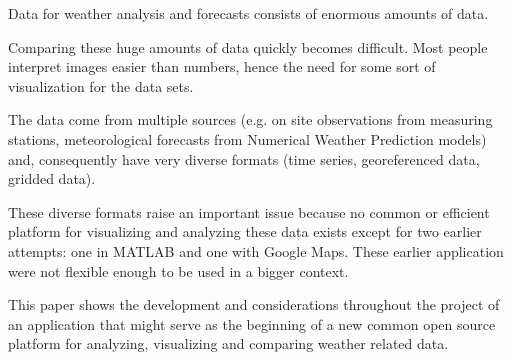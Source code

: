 \label{sec:abstract}
Data for weather analysis and forecasts consists of enormous amounts of data.

Comparing these huge amounts of data quickly becomes difficult. Most people interpret images easier than numbers, hence the need for some sort of visualization for the data sets.

The data come from multiple sources (e.g. on site observations from measuring stations, meteorological forecasts from Numerical Weather Prediction models) and, consequently have very diverse formats (time series, georeferenced data, gridded data).

These diverse formats raise an important issue because no common or efficient platform for visualizing and analyzing these data exists except for two earlier attempts: one in MATLAB and one with Google Maps. These earlier application were not flexible enough to be used in a bigger context.

This paper shows the development and considerations throughout the project of an application that might serve as the beginning of a new common open source platform for analyzing, visualizing and comparing weather related data.
